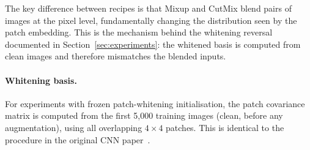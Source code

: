 The key difference between recipes is that Mixup and CutMix blend pairs of images at the pixel level, fundamentally changing the distribution seen by the patch embedding.
This is the mechanism behind the whitening reversal documented in Section~\ref{sec:experiments}: the whitened basis is computed from clean images and therefore mismatches the blended inputs.

\paragraph{Whitening basis.}
For experiments with frozen patch-whitening initialisation, the patch covariance matrix is computed from the first 5{,}000 training images (clean, before any augmentation), using all overlapping $4\times4$ patches.
This is identical to the procedure in the original CNN paper~\cite{garg2024cifar10}.
